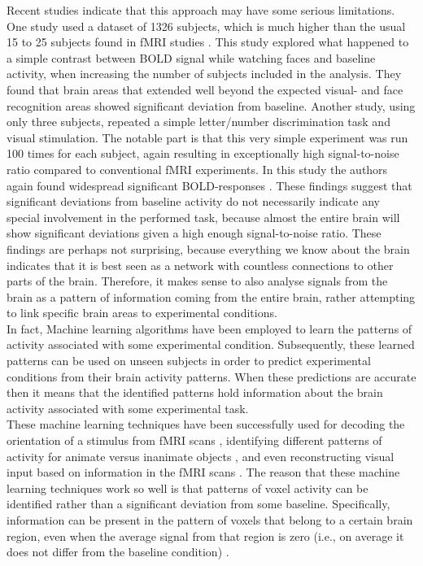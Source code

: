 \documentclass[preprint,journal,11pt]{vgtc}
\begin{document}
\indent Recent studies indicate that this approach may have some serious limitations. One study used a dataset of 1326 subjects, which is much higher than the usual 15 to 25 subjects found in fMRI studies \cite{thy:2012very}. This study explored what happened to a simple contrast between BOLD signal while watching faces and baseline activity, when increasing the number of subjects included in the analysis. They found that brain areas that extended well beyond the expected visual- and face recognition areas showed significant deviation from baseline. Another study, using only three subjects, repeated a simple letter/number discrimination task and visual stimulation. The notable part is that this very simple experiment was run 100 times for each subject, again resulting in exceptionally high signal-to-noise ratio compared to conventional fMRI experiments. In this study the authors again found widespread significant BOLD-responses \cite{go:2012whole}. These findings suggest that significant deviations from baseline activity do not necessarily indicate any special involvement in the performed task, because almost the entire brain will show significant deviations given a high enough signal-to-noise ratio. These findings are perhaps not surprising, because everything we know about the brain indicates that it is best seen as a network with countless connections to other parts of the brain. Therefore, it makes sense to also analyse signals from the brain as a pattern of information coming from the entire brain, rather attempting to link specific brain areas to experimental conditions.\\
\indent In fact, Machine learning algorithms have been employed to learn the patterns of activity associated with some experimental condition. Subsequently, these learned patterns can be used on unseen subjects in order to predict experimental conditions from their brain activity patterns. When these predictions are accurate then it means that the identified patterns hold information about the brain activity associated with some experimental task.\\
\indent These machine learning techniques have been successfully used for decoding the orientation of a stimulus from fMRI scans \cite{ka:2005decoding}, identifying different patterns of activity for animate versus inanimate objects \cite{kr:2008RSA}, and even reconstructing visual input based on information in the fMRI scans \cite{mi:2008re}. The reason that these machine learning techniques work so well is that patterns of voxel activity can be identified rather than a significant deviation from some baseline. Specifically, information can be present in the pattern of voxels that belong to a certain brain region, even when the average signal from that region is zero (i.e., on average it does not differ from the baseline condition) \cite{to:2012rev}. \\
\end{document}

